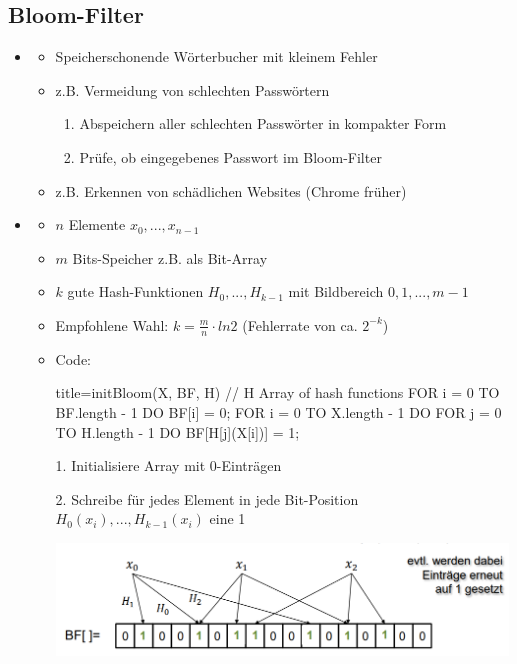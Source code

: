 \documentclass[
    12pt,
    a4paper,
    ngerman,
    color=3b,%
    marginpar=false,
    colorback=false,
    leqno,
]{tudaexercise}
\begin{document}
\subsection{Bloom-Filter}\label{Bloom-Filter}
    \begin{itemize}
        \item {}
            \begin{itemize}
                \item Speicherschonende Wörterbucher mit kleinem Fehler
                \item z.B. Vermeidung von schlechten Passwörtern 
                    \begin{enumerate}
                        \item Abspeichern aller schlechten Passwörter in kompakter Form
                        \item Prüfe, ob eingegebenes Passwort im Bloom-Filter
                    \end{enumerate}
                \item z.B. Erkennen von schädlichen Websites (Chrome früher)
            \end{itemize}

        \item {}
            \begin{itemize}
                \item $n$ Elemente $x_0,...,x_{n-1}$
                \item $m$ Bits-Speicher z.B. als Bit-Array
                \item $k$ gute Hash-Funktionen $H_0,...,H_{k-1}$ mit Bildbereich $0,1,...,m-1$
                \item Empfohlene Wahl: $k = \frac{m}{n} \cdot ln2$ (Fehlerrate von ca. $2^{-k}$)
                \clearpage
                \item Code:
                \item[]
                    \begin{ccode}[autogobble]{title={initBloom(X, BF, H) // H Array of hash functions}}
                    FOR i = 0 TO BF.length - 1 DO 
                        BF[i] = 0;
                    FOR i = 0 TO X.length - 1 DO
                        FOR j = 0 TO H.length - 1 DO
                            BF[H[j](X[i])] = 1;
                    \end{ccode}
                \item[]
                \item[1.] Initialisiere Array mit 0-Einträgen
                \item[2.] Schreibe für jedes Element in jede Bit-Position $H_0(x_i),...,H_{k-1}(x_i)$ eine 1 
                \item[] \includegraphics[width=12cm]{pictures/bloomCreate.PNG} 
            \end{itemize}


\end{itemize}
\end{document}

